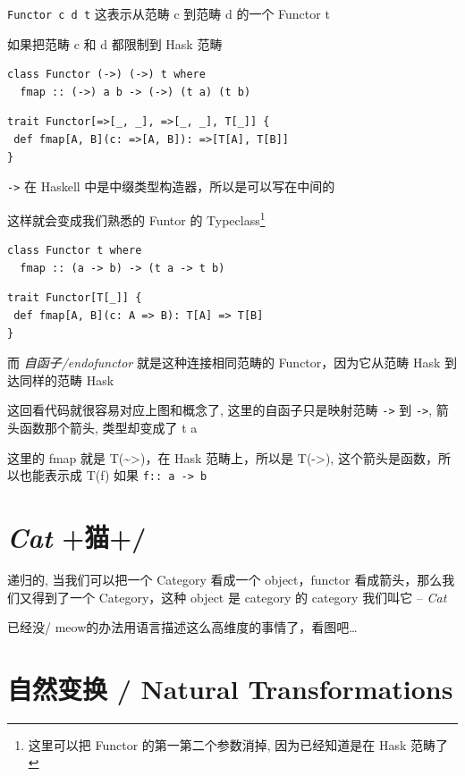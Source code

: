 \documentclass[11pt]{tufte-book}
\begin{document}
\texttt{Functor c d t} 这表示从范畴 c 到范畴 d 的一个 Functor t

如果把范畴 c 和 d 都限制到 Hask 范畴

\begin{verbatim}
class Functor (->) (->) t where
  fmap :: (->) a b -> (->) (t a) (t b)
\end{verbatim}

\begin{verbatim}
trait Functor[=>[_, _], =>[_, _], T[_]] {
 def fmap[A, B](c: =>[A, B]): =>[T[A], T[B]]
}
\end{verbatim}
\texttt{->} 在 Haskell 中是中缀类型构造器，所以是可以写在中间的

这样就会变成我们熟悉的 Funtor 的 Typeclass\footnote{这里可以把 Functor 的第一第二个参数消掉, 因为已经知道是在 Hask 范畴了}

\begin{verbatim}
class Functor t where
  fmap :: (a -> b) -> (t a -> t b)
\end{verbatim}

\begin{verbatim}
trait Functor[T[_]] {
 def fmap[A, B](c: A => B): T[A] => T[B]
}
\end{verbatim}

而 \emph{自函子/endofunctor} 就是这种连接相同范畴的 Functor，因为它从范畴 Hask 到达同样的范畴 Hask

这回看代码就很容易对应上图和概念了, 这里的自函子只是映射范畴 \texttt{->} 到 \texttt{->}, 箭头函数那个箭头, 类型却变成了 t a

这里的 fmap 就是 T(\textasciitilde{}>)，在 Hask 范畴上，所以是 T(->), 这个箭头是函数，所以也能表示成 T(f) 如果 \texttt{f:: a -> b}

\chapter{\emph{Cat} +猫+/}
\label{sec:org248e5d9}

递归的, 当我们可以把一个 Category 看成一个 object，functor 看成箭头，那么我们又得到了一个 Category，这种 object 是 category 的 category 我们叫它 -- \emph{Cat}

已经没/ meow的办法用语言描述这么高维度的事情了，看图吧\ldots{}

\chapter{自然变换 / Natural Transformations \label{org75e4d4a}}
\label{sec:orgc943a0e}
\end{document}
